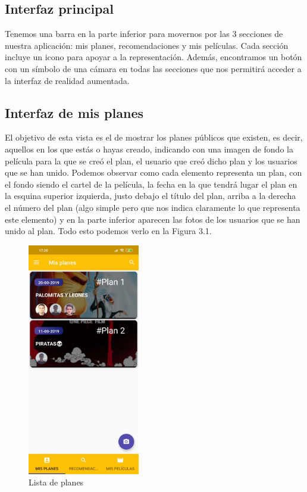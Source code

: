 \subsection{Interfaz principal}
\label{makereference3.4.1}
Tenemos una barra en la parte inferior para movernos por las 3 secciones de nuestra aplicación: mis planes, recomendaciones y mis películas.
Cada sección incluye un icono para apoyar a la representación.
Además, encontramos un botón con un símbolo de una cámara en todas las secciones que nos permitirá acceder a la interfaz de realidad aumentada.
\subsection{Interfaz de mis planes}
\label{makereference3.4.2}
El objetivo de esta vista es el de mostrar los planes públicos que existen, es decir, aquellos en los que estás o hayas creado, indicando con una imagen de fondo la película para la que se creó el plan, el usuario
que creó dicho plan y los usuarios que se han unido. 
Podemos observar como cada elemento representa un plan, con el fondo siendo el cartel de la película, la fecha en la que tendrá lugar el plan en la esquina superior izquierda,
justo debajo el título del plan, arriba a la derecha el número del plan (algo simple pero que nos indica
claramente lo que representa este elemento) y en la parte inferior aparecen las fotos de los usuarios que se han unido al plan.
Todo esto podemos verlo en la Figura 3.1.
\begin{figure}[H]
    \centering
    \includegraphics[height=4in]{figures/plansList.jpg}
    \caption{Lista de planes}
    \label{fig:birds}
\end{figure}

